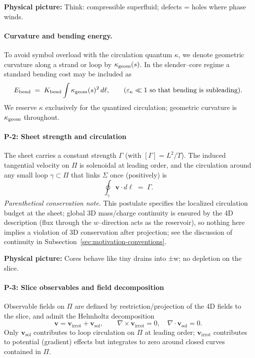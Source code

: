 \begin{physbox}\textbf{Physical picture:} Think: compressible superfluid; defects = holes where phase winds.\end{physbox}

\paragraph*{Curvature and bending energy.}
To avoid symbol overload with the circulation quantum $\kappa$, we denote geometric curvature along a strand or loop by $\kappa_{\rm geom}(s)$. In the slender–core regime a standard bending cost may be included as
\[
E_{\rm bend}\;=\;K_{\rm bend}\int \kappa_{\rm geom}(s)^2\,d\ell,\qquad (\varepsilon_\kappa\ll1\ \text{so that bending is subleading}).
\]
We reserve $\kappa$ exclusively for the quantized circulation; geometric curvature is $\kappa_{\rm geom}$ throughout.

\paragraph{P-2: Sheet strength and circulation}
\label{post:P2}
The sheet carries a constant strength $\Gamma$ (with $[\Gamma]=L^2/T$). The induced tangential velocity on $\Pi$ is solenoidal at leading order, and the circulation around any small loop $\gamma\subset\Pi$ that links $\Sigma$ once (positively) is
\[
\oint_{\gamma}\mathbf{v}\cdot d\boldsymbol{\ell}\;=\;\Gamma.
\]
\emph{Parenthetical conservation note.} This postulate specifies the localized circulation budget at the sheet; global 3D mass/charge continuity is ensured by the 4D description (flux through the $w$–direction acts as the reservoir), so nothing here implies a violation of 3D conservation after projection; see the discussion of continuity in Subsection~\ref{sec:motivation-conventions}.

\begin{physbox}\textbf{Physical picture:} Cores behave like tiny drains into ±w; no depletion on the slice.\end{physbox}

\paragraph{P-3: Slice observables and field decomposition}
\label{post:P3}
Observable fields on $\Pi$ are defined by restriction/projection of the 4D fields to the slice, and admit the Helmholtz decomposition
\[
\mathbf{v}=\mathbf{v}_{\mathrm{irrot}}+\mathbf{v}_{\mathrm{sol}},\qquad
\nabla\times \mathbf{v}_{\mathrm{irrot}}=0,\quad
\nabla\cdot \mathbf{v}_{\mathrm{sol}}=0.
\]
Only $\mathbf{v}_{\mathrm{sol}}$ contributes to loop circulation on $\Pi$ at leading order; $\mathbf{v}_{\mathrm{irrot}}$ contributes to potential (gradient) effects but integrates to zero around closed curves contained in $\Pi$.

